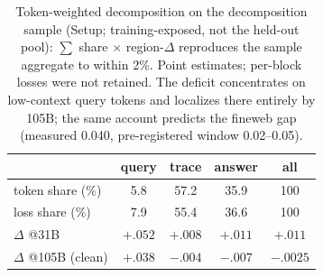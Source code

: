 \begin{table}[tb]\centering\footnotesize
\setlength{\tabcolsep}{4pt}
\begin{tabular}{@{}lcccc@{}}
\toprule
& query & trace & answer & all \\
\midrule
token share (\%) & 5.8 & 57.2 & 35.9 & 100 \\
loss share (\%) & 7.9 & 55.4 & 36.6 & 100 \\
\midrule
$\Delta$ @31B & $+.052$ & $+.008$ & $+.011$ & $+.011$ \\
$\Delta$ @105B (clean) & $+.038$ & $-.004$ & $-.007$ & $-.0025$ \\
\bottomrule
\end{tabular}
\caption{Token-weighted decomposition on the decomposition sample (Setup;
training-exposed, not the held-out pool): $\sum$ share $\times$
region-$\Delta$ reproduces the sample aggregate to within 2\%. Point
estimates; per-block losses were not retained. The deficit
concentrates on low-context query tokens and localizes there entirely by
105B; the same account predicts the fineweb gap (measured 0.040,
pre-registered window 0.02--0.05).}
\label{tab:regions}
\end{table}
